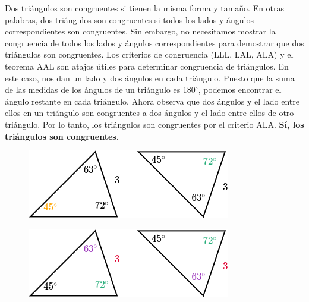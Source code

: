 \begin{solutionbox}{7cm}
    \begin{minipage}[t][][t]{0.55\textwidth}
        Dos triángulos son congruentes si tienen la misma forma y tamaño. En otras palabras, dos triángulos son congruentes si todos los lados y ángulos correspondientes son congruentes.
        Sin embargo, no necesitamos mostrar la congruencia de todos los lados y ángulos correspondientes para demostrar que dos triángulos son congruentes. Los criterios de congruencia (LLL, LAL, ALA) y el teorema AAL son atajos útiles para determinar congruencia de triángulos.
        En este caso, nos dan un lado y dos ángulos en cada triángulo.
        Puesto que la suma de las medidas de los ángulos de un triángulo es 180$^\circ$, podemos encontrar el ángulo restante en cada triángulo.
        Ahora observa que dos ángulos y el lado entre ellos en un triángulo son congruentes a dos ángulos y el lado entre ellos de otro triángulo.
        Por lo tanto, los triángulos son congruentes por el criterio ALA.
        \textbf{Sí, los triángulos son congruentes.}
    \end{minipage}\hfill
    \begin{minipage}[t][][t]{0.3\textwidth}
        \begin{figure}[H]
            \centering
            \includegraphics[width=0.8\linewidth]{../images/20230323155725}
            \caption{}
            \label{fig:20230323155725}
        \end{figure}

        \begin{figure}[H]
            \centering
            \includegraphics[width=0.8\linewidth]{../images/20230323155732}
            \caption{}
            \label{fig:20230323155732}
        \end{figure}
    \end{minipage}
\end{solutionbox}